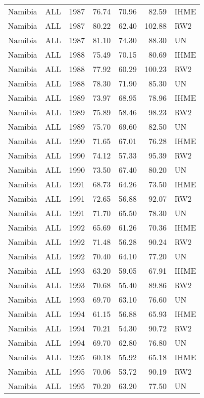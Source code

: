 \begin{longtable}{lllrrrl}
  Namibia & ALL & 1987 & 76.74 & 70.96 & 82.59 & IHME \\ 
  Namibia & ALL & 1987 & 80.22 & 62.40 & 102.88 & RW2 \\ 
  Namibia & ALL & 1987 & 81.10 & 74.30 & 88.30 & UN \\ 
  Namibia & ALL & 1988 & 75.49 & 70.15 & 80.69 & IHME \\ 
  Namibia & ALL & 1988 & 77.92 & 60.29 & 100.23 & RW2 \\ 
  Namibia & ALL & 1988 & 78.30 & 71.90 & 85.30 & UN \\ 
  Namibia & ALL & 1989 & 73.97 & 68.95 & 78.96 & IHME \\ 
  Namibia & ALL & 1989 & 75.89 & 58.46 & 98.23 & RW2 \\ 
  Namibia & ALL & 1989 & 75.70 & 69.60 & 82.50 & UN \\ 
  Namibia & ALL & 1990 & 71.65 & 67.01 & 76.28 & IHME \\ 
  Namibia & ALL & 1990 & 74.12 & 57.33 & 95.39 & RW2 \\ 
  Namibia & ALL & 1990 & 73.50 & 67.40 & 80.20 & UN \\ 
  Namibia & ALL & 1991 & 68.73 & 64.26 & 73.50 & IHME \\ 
  Namibia & ALL & 1991 & 72.65 & 56.88 & 92.07 & RW2 \\ 
  Namibia & ALL & 1991 & 71.70 & 65.50 & 78.30 & UN \\ 
  Namibia & ALL & 1992 & 65.69 & 61.26 & 70.36 & IHME \\ 
  Namibia & ALL & 1992 & 71.48 & 56.28 & 90.24 & RW2 \\ 
  Namibia & ALL & 1992 & 70.40 & 64.10 & 77.20 & UN \\ 
  Namibia & ALL & 1993 & 63.20 & 59.05 & 67.91 & IHME \\ 
  Namibia & ALL & 1993 & 70.68 & 55.40 & 89.86 & RW2 \\ 
  Namibia & ALL & 1993 & 69.70 & 63.10 & 76.60 & UN \\ 
  Namibia & ALL & 1994 & 61.15 & 56.88 & 65.93 & IHME \\ 
  Namibia & ALL & 1994 & 70.21 & 54.30 & 90.72 & RW2 \\ 
  Namibia & ALL & 1994 & 69.70 & 62.80 & 76.80 & UN \\ 
  Namibia & ALL & 1995 & 60.18 & 55.92 & 65.18 & IHME \\ 
  Namibia & ALL & 1995 & 70.06 & 53.72 & 90.19 & RW2 \\ 
  Namibia & ALL & 1995 & 70.20 & 63.20 & 77.50 & UN \\ 

\end{longtable}
